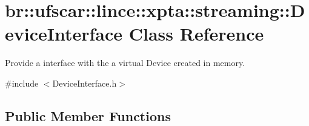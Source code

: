 \hypertarget{classbr_1_1ufscar_1_1lince_1_1xpta_1_1streaming_1_1DeviceInterface}{
\section{br::ufscar::lince::xpta::streaming::DeviceInterface Class Reference}
\label{classbr_1_1ufscar_1_1lince_1_1xpta_1_1streaming_1_1DeviceInterface}
}


Provide a interface with the a virtual Device created in memory.  




{\ttfamily \#include $<$DeviceInterface.h$>$}

\subsection*{Public Member Functions}
